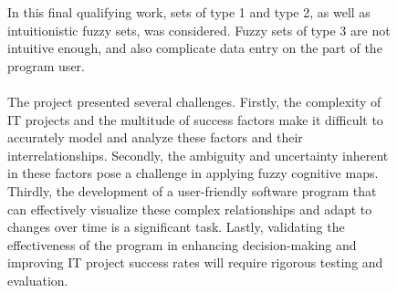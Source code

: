 \documentclass{article}
\begin{document}
    \begin{figure}[!t]
        \fontsize{8}{7}\selectfont
        \begin{minipage}{0.49\textwidth}
            In this final qualifying work, sets of type 1 and type 2, as well as intuitionistic fuzzy sets, was considered. Fuzzy sets of type 3 are not intuitive enough, and also complicate data entry on the part of the program user.\\
            ~\\
            The project presented several challenges. Firstly, the complexity of IT projects and the multitude of success factors make it difficult to accurately model and analyze these factors and their interrelationships. Secondly, the ambiguity and uncertainty inherent in these factors pose a challenge in applying fuzzy cognitive maps. Thirdly, the development of a user-friendly software program that can effectively visualize these complex relationships and adapt to changes over time is a significant task. Lastly, validating the effectiveness of the program in enhancing decision-making and improving IT project success rates will require rigorous testing and evaluation.\\
            \begin{center}

\end{center}
\end{minipage}
\end{figure}
\end{document}
